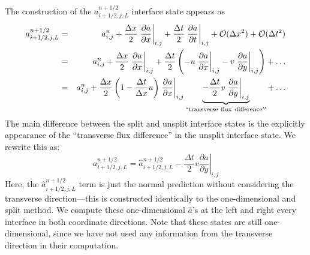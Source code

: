 \documentclass[11pt]{article}
\begin{document}
The construction of the $a_{i+1/2,j,L}^{n+1/2}$ interface state appears as
\begin{eqnarray}
a_{i+1/2,j,L}^{n+1/2} &=& a_{i,j}^n + 
  \frac{\Delta x}{2} \left .\frac{\partial a}{\partial x} \right |_{i,j} + 
  \frac{\Delta t}{2} \left .\frac{\partial a}{\partial t} \right |_{i,j} + 
  \mathcal{O}(\Delta x^2) + \mathcal{O}(\Delta t^2) \nonumber \\
 &=& a_{i,j}^n + 
   \frac{\Delta x}{2} \left .\frac{\partial a}{\partial x} \right |_{i,j} + 
   \frac{\Delta t}{2} \left ( 
   - u \left .\frac{\partial a}{\partial x} \right |_{i,j} 
   - v \left .\frac{\partial a}{\partial y} \right |_{i,j} \right
   ) + \ldots \nonumber \\
    &=& a_{i,j}^n + 
   \frac{\Delta x}{2} \left ( 1 - \frac{\Delta t}{\Delta x} u \right ) 
   \left .\frac{\partial a}{\partial x} \right |_{i,j} \underbrace{-
   \frac{\Delta t}{2} v \left .\frac{\partial a}{\partial y} \right |_{i,j}}_{\mathrm{``transverse~flux~difference''}} +
   \ldots \label{eq:statelu}
\end{eqnarray}
The main difference between the split and unsplit interface states is the
explicitly appearance of the ``transverse flux difference'' in the unsplit
interface state.  We rewrite this as:
\begin{equation}
a_{i+1/2,j,L}^{n+1/2} = \hat{a}_{i+1/2,j,L}^{n+1/2} 
   - \frac{\Delta t}{2} v \left .\frac{\partial a}{\partial y} \right |_{i,j}
\end{equation}
Here, the $\hat{a}_{i+1/2,j,L}^{n+1/2}$ term is just the normal
prediction without considering the transverse direction---this is
constructed identically to the one-dimensional and split method.  We
compute these one-dimensional $\hat{a}$'s at the left and right every
interface in both coordinate directions.  Note that these states are
still one-dimensional, since we have not used any information from the
transverse direction in their computation.  
\end{document}
